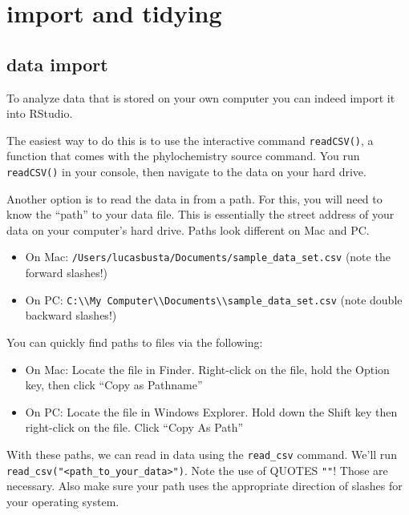 \documentclass[
]{krantz}
\providecommand{\tightlist}{%
  \setlength{\itemsep}{0pt}\setlength{\parskip}{0pt}}
\begin{document}
\hypertarget{import-and-tidying}{%
\section{import and tidying}\label{import-and-tidying}}

\hypertarget{data-import}{%
\subsection{data import}\label{data-import}}

To analyze data that is stored on your own computer you can indeed import it into RStudio.

The easiest way to do this is to use the interactive command \texttt{readCSV()}, a function that comes with the phylochemistry source command. You run \texttt{readCSV()} in your console, then navigate to the data on your hard drive.

Another option is to read the data in from a path. For this, you will need to know the ``path'' to your data file. This is essentially the street address of your data on your computer's hard drive. Paths look different on Mac and PC.

\begin{itemize}
\tightlist
\item
  On Mac: \texttt{/Users/lucasbusta/Documents/sample\_data\_set.csv} (note the forward slashes!)
\item
  On PC: \texttt{C:\textbackslash{}\textbackslash{}My\ Computer\textbackslash{}\textbackslash{}Documents\textbackslash{}\textbackslash{}sample\_data\_set.csv} (note double backward slashes!)
\end{itemize}

You can quickly find paths to files via the following:

\begin{itemize}
\tightlist
\item
  On Mac: Locate the file in Finder. Right-click on the file, hold the Option key, then click ``Copy as Pathname''
\item
  On PC: Locate the file in Windows Explorer. Hold down the Shift key then right-click on the file. Click ``Copy As Path''
\end{itemize}

With these paths, we can read in data using the \texttt{read\_csv} command. We'll run \texttt{read\_csv("\textless{}path\_to\_your\_data\textgreater{}")}. Note the use of QUOTES \texttt{""}! Those are necessary. Also make sure your path uses the appropriate direction of slashes for your operating system.
\end{document}

